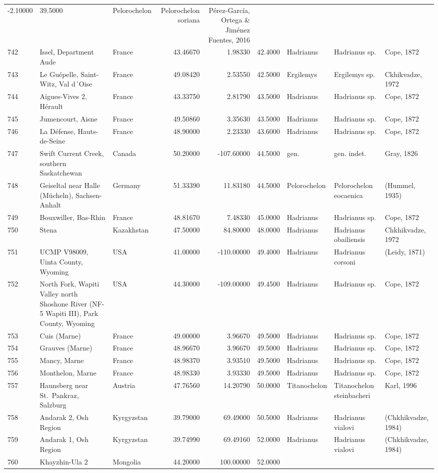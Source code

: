 \documentclass[]{article}
\begin{document}
\begin{longtable}[]{@{}lllrrrlll@{}}
-2.10000 & 39.5000 & Pelorochelon & Pelorochelon soriana & Pérez-García,
Ortega \& Jiménez Fuentes, 2016\tabularnewline
742 & Issel, Department Aude & France & 43.46670 & 1.98330 & 42.4000 &
Hadrianus & Hadrianus sp. & Cope, 1872\tabularnewline
743 & Le Guépelle, Saint-Witz, Val d´Oise & France & 49.08420 & 2.53550
& 42.5000 & Ergilemys & Ergilemys sp. & Ckhikvadze, 1972\tabularnewline
744 & Aigues-Vives 2, Hérault & France & 43.33750 & 2.81790 & 43.5000 &
Hadrianus & Hadrianus sp. & Cope, 1872\tabularnewline
745 & Jumencourt, Aisne & France & 49.50860 & 3.35630 & 43.5000 &
Hadrianus & Hadrianus sp. & Cope, 1872\tabularnewline
746 & La Défense, Hauts-de-Seine & France & 48.90000 & 2.23330 & 43.6000
& Hadrianus & Hadrianus sp. & Cope, 1872\tabularnewline
747 & Swift Current Creek, southern Saskatchewan & Canada & 50.20000 &
-107.60000 & 44.5000 & gen. & gen. indet. & Gray, 1826\tabularnewline
748 & Geiseltal near Halle (Mücheln), Sachsen-Anhalt & Germany &
51.33390 & 11.83180 & 44.5000 & Pelorochelon & Pelorochelon eocaenica &
(Hummel, 1935)\tabularnewline
749 & Bouxwiller, Bas-Rhin & France & 48.81670 & 7.48330 & 45.0000 &
Hadrianus & Hadrianus sp. & Cope, 1872\tabularnewline
750 & Stena & Kazakhstan & 47.50000 & 84.80000 & 48.0000 & Hadrianus &
Hadrianus obailiensis & Chkhikvadze, 1972\tabularnewline
751 & UCMP V98009, Uinta County, Wyoming & USA & 41.00000 & -110.00000 &
49.4000 & Hadrianus & Hadrianus corsoni & (Leidy, 1871)\tabularnewline
752 & North Fork, Wapiti Valley north Shoshone River (NF-5 Wapiti III),
Park County, Wyoming & USA & 44.30000 & -109.00000 & 49.4500 & Hadrianus
& Hadrianus sp. & Cope, 1872\tabularnewline
753 & Cuis (Marne) & France & 49.00000 & 3.96670 & 49.5000 & Hadrianus &
Hadrianus sp. & Cope, 1872\tabularnewline
754 & Grauves (Marne) & France & 48.96670 & 3.96670 & 49.5000 &
Hadrianus & Hadrianus sp. & Cope, 1872\tabularnewline
755 & Mancy, Marne & France & 48.98370 & 3.93510 & 49.5000 & Hadrianus &
Hadrianus sp. & Cope, 1872\tabularnewline
756 & Monthelon, Marne & France & 48.98330 & 3.93330 & 49.5000 &
Hadrianus & Hadrianus sp. & Cope, 1872\tabularnewline
757 & Haunsberg near St.~Pankraz, Salzburg & Austria & 47.76560 &
14.20790 & 50.0000 & Titanochelon & Titanochelon steinbacheri & Karl,
1996\tabularnewline
758 & Andarak 2, Osh Region & Kyrgyzstan & 39.79000 & 69.49000 & 50.5000
& Hadrianus & Hadrianus vialovi & (Chkhikvadze, 1984)\tabularnewline
759 & Andarak 1, Osh Region & Kyrgyzstan & 39.74990 & 69.49160 & 52.0000
& Hadrianus & Hadrianus vialovi & (Chkhikvadze, 1984)\tabularnewline
760 & Khayzhin-Ula 2 & Mongolia & 44.20000 & 100.00000 & 52.0000 &

\end{longtable}
\end{document}
